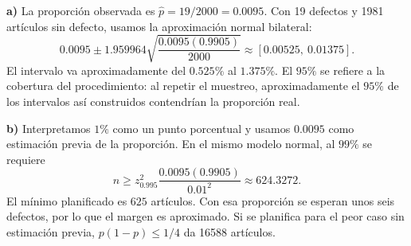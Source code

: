 \textbf{a)} La proporción observada es $\hat p=19/2000=0.0095$.
Con 19 defectos y 1981 artículos sin defecto, usamos la
aproximación normal bilateral:
\[
0.0095\pm1.959964\sqrt{\frac{0.0095(0.9905)}{2000}}
\approx\boxed{[0.00525,\ 0.01375]}.
\]
El intervalo va aproximadamente del $0.525\%$ al $1.375\%$.
El $95\%$ se refiere a la cobertura del procedimiento:
al repetir el muestreo, aproximadamente el $95\%$ de los
intervalos así construidos contendrían la proporción real.

\textbf{b)} Interpretamos $1\%$ como un punto porcentual y
usamos $0.0095$ como estimación previa de la proporción.
En el mismo modelo normal, al $99\%$ se requiere
\[
n\ge z_{0.995}^2\frac{0.0095(0.9905)}{0.01^2}
\approx624.3272.
\]
El mínimo planificado es $\boxed{625}$ artículos. Con esa
proporción se esperan unos seis defectos, por lo que el margen
es aproximado. Si se planifica para el peor caso sin estimación
previa, $p(1-p)\le1/4$ da 16588 artículos.
